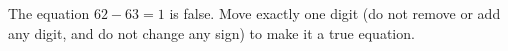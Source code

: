 The equation $62-63=1$ is false. Move exactly one digit (do not remove or add any digit, and do not change any sign) to make it a true equation.
